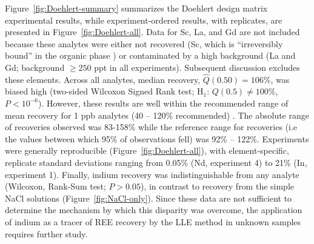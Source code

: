 Figure~\ref{fig:Doehlert-summary} summarizes the Doehlert design matrix experimental results, while experiment-ordered results, with replicates, are presented in Figure~\ref{fig:Doehlert-all}.
Data for Sc, La, and Gd are not included because these analytes were either not recovered (Sc, which is ``irreversibly bound'' in the organic phase \citep{Kimura_BCSJ_1960})
or contaminated by a high background (La and Gd; background $\geq 250$ ppt in all experiments).
Subsequent discussion excludes these elements.
Across all analytes, median recovery, $\widehat{Q}(0.50)=106\%$, was biased high (two-sided Wilcoxon Signed Rank test; H$_1$: $Q(0.5)\neq100\%$, $P < 10^{-6}$). However, these results are well within the recommended range of mean recovery for 1 ppb analytes (40 -- 120\% recommended) \citep{Taverniers_TrAC_2004}.
The absolute range of recoveries observed was 83-158\% while the reference range for recoveries (i.e the values between which 95\% of observations fell) was 92\% -- 122\%.
Experiments were generally reproducible (Figure~\ref{fig:Doehlert-all}), with element-specific, replicate standard deviations ranging from 0.05\% (Nd, experiment 4) to 21\% (In, experiment 1).
Finally, indium recovery was indistinguishable from any analyte (Wilcoxon, Rank-Sum test; $P>0.05$), in contrast to recovery from the simple NaCl solutions (Figure~\ref{fig:NaCl-only}).
Since these data are not sufficient to determine the mechanism by which this disparity was overcome, the application of indium as a tracer of REE recovery by the LLE method in unknown samples requires further study.

